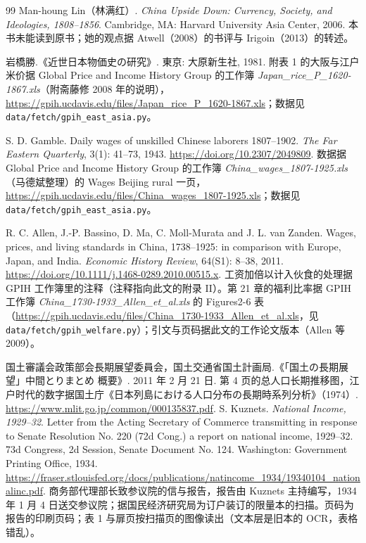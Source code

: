 \begin{thebibliography}{99}
 Man-houng Lin（林满红）. \emph{China Upside Down: Currency, Society, and Ideologies, 1808--1856}. Cambridge, MA: Harvard University Asia Center, 2006. 本书未能读到原书；她的观点据 Atwell（2008）的书评与 Irigoin（2013）的转述。

 岩橋勝.《近世日本物価史の研究》. 東京: 大原新生社, 1981. 附表 1 的大阪与江户米价据 Global Price and Income History Group 的工作簿 \emph{Japan\_rice\_P\_1620-1867.xls}（附斋藤修 2008 年的说明），\url{https://gpih.ucdavis.edu/files/Japan_rice_P_1620-1867.xls}；数据见 \texttt{data/fetch/gpih\_east\_asia.py}。

 S. D. Gamble. Daily wages of unskilled Chinese laborers 1807--1902. \emph{The Far Eastern Quarterly}, 3(1): 41--73, 1943. \url{https://doi.org/10.2307/2049809}. 数据据 Global Price and Income History Group 的工作簿 \emph{China\_wages\_1807-1925.xls}（马德斌整理）的 Wages Beijing rural 一页，\url{https://gpih.ucdavis.edu/files/China_wages_1807-1925.xls}；数据见 \texttt{data/fetch/gpih\_east\_asia.py}。

 R. C. Allen, J.-P. Bassino, D. Ma, C. Moll-Murata and J. L. van Zanden. Wages, prices, and living standards in China, 1738--1925: in comparison with Europe, Japan, and India. \emph{Economic History Review}, 64(S1): 8--38, 2011. \url{https://doi.org/10.1111/j.1468-0289.2010.00515.x}. 工资加倍以计入伙食的处理据 GPIH 工作簿里的注释（注释指向此文的附录 II）。第 21 章的福利比率据 GPIH 工作簿 \emph{China\_1730-1933\_Allen\_et\_al.xls} 的 Figures2-6 表（\url{https://gpih.ucdavis.edu/files/China_1730-1933_Allen_et_al.xls}，见 \texttt{data/fetch/gpih\_welfare.py}）；引文与页码据此文的工作论文版本（Allen 等 2009）。

 国土審議会政策部会長期展望委員会，国土交通省国土計画局.《「国土の長期展望」中間とりまとめ 概要》. 2011 年 2 月 21 日. 第 4 页的总人口长期推移图，江户时代的数字据国土庁《日本列島における人口分布の長期時系列分析》（1974）. \url{https://www.mlit.go.jp/common/000135837.pdf}.
 S. Kuznets. \emph{National Income, 1929--32}. Letter from the Acting Secretary of Commerce transmitting in response to Senate Resolution No. 220 (72d Cong.) a report on national income, 1929--32. 73d Congress, 2d Session, Senate Document No. 124. Washington: Government Printing Office, 1934. \url{https://fraser.stlouisfed.org/docs/publications/natincome_1934/19340104_nationalinc.pdf}. 商务部代理部长致参议院的信与报告，报告由 Kuznets 主持编写，1934 年 1 月 4 日送交参议院；据国民经济研究局为订户装订的限量本的扫描。页码为报告的印刷页码；表 1 与扉页按扫描页的图像读出（文本层是旧本的 OCR，表格错乱）。


\end{thebibliography}
